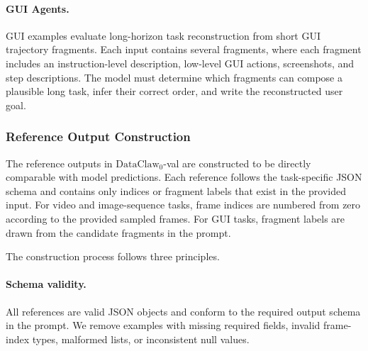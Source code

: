 \paragraph{GUI Agents.}
GUI examples evaluate long-horizon task reconstruction from short GUI trajectory fragments. Each input contains several fragments, where each fragment includes an instruction-level description, low-level GUI actions, screenshots, and step descriptions. The model must determine which fragments can compose a plausible long task, infer their correct order, and write the reconstructed user goal. 

\subsubsection{Reference Output Construction}
\label{app:reference_output_construction}

The reference outputs in $\text{DataClaw}_0$-val are constructed to be directly comparable with model predictions. Each reference follows the task-specific JSON schema and contains only indices or fragment labels that exist in the provided input. For video and image-sequence tasks, frame indices are numbered from zero according to the provided sampled frames. For GUI tasks, fragment labels are drawn from the candidate fragments in the prompt.

The construction process follows three principles.

\paragraph{Schema validity.}
All references are valid JSON objects and conform to the required output schema in the prompt. We remove examples with missing required fields, invalid frame-index types, malformed lists, or inconsistent null values.


